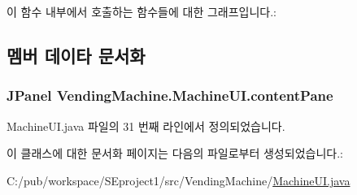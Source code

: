 이 함수 내부에서 호출하는 함수들에 대한 그래프입니다.\+:




\subsection{멤버 데이타 문서화}
\subsubsection[{\texorpdfstring{content\+Pane}{contentPane}}]{\setlength{\rightskip}{0pt plus 5cm}J\+Panel Vending\+Machine.\+Machine\+U\+I.\+content\+Pane\hspace{0.3cm}{\ttfamily [private]}}\hypertarget{class_vending_machine_1_1_machine_u_i_ac8ef25585e46da798d067af0eefa1a03}{}\label{class_vending_machine_1_1_machine_u_i_ac8ef25585e46da798d067af0eefa1a03}


Machine\+U\+I.\+java 파일의 31 번째 라인에서 정의되었습니다.



이 클래스에 대한 문서화 페이지는 다음의 파일로부터 생성되었습니다.\+:\begin{DoxyCompactItemize}
\item 
C\+:/pub/workspace/\+S\+Eproject1/src/\+Vending\+Machine/\hyperlink{_machine_u_i_8java}{Machine\+U\+I.\+java}\end{DoxyCompactItemize}
